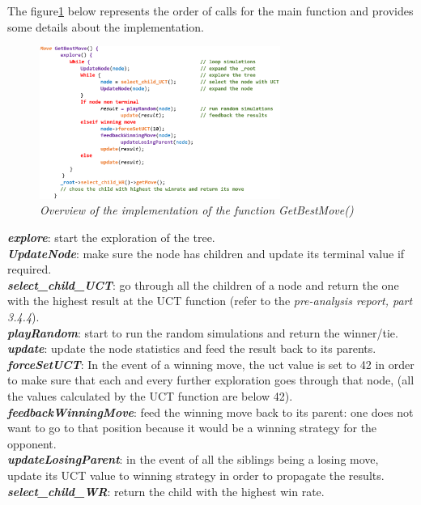 The figure\ref{fig:MCTSAlgorithm} below represents the order of calls for the main function and provides some details about the implementation.
\begin{figure}[H]
\centerline{\includegraphics[width=0.7\textwidth]{Base_Algorithm/Img/Algorithm.png}}
\caption{\label{fig:MCTSAlgorithm}\textit{Overview of the implementation of the function GetBestMove()}}
\end{figure}
\noindent
\textit{\textbf{explore}}: start the exploration of the tree.
\medskip\\
\textit{\textbf{UpdateNode}}: make sure the node has children and update its terminal value if required.
\medskip\\
\textit{\textbf{select\_child\_UCT}}: go through all the children of a node and return the one with the highest result at the UCT function (refer to the \textit{pre-analysis report, part 3.4.4}).
\medskip\\
\textit{\textbf{playRandom}}: start to run the random simulations and return the winner/tie.
\medskip\\
\textit{\textbf{update}}: update the node statistics and feed the result back to its parents.
\medskip\\
\textit{\textbf{forceSetUCT}}: In the event of a winning move, the uct value is set to 42 in order to make sure that each and every further exploration goes through that node, (all the values calculated by the UCT function are below 42).
\medskip\\
\textit{\textbf{feedbackWinningMove}}: feed the winning move back to its parent: one does not want to go to that position because it would be a winning strategy for the opponent.
\medskip\\
\textit{\textbf{updateLosingParent}}: in the event of all the siblings being a losing move, update its UCT value to winning strategy in order to propagate the results.
\medskip\\
\textit{\textbf{select\_child\_WR}}: return the child with the highest win rate.\\
